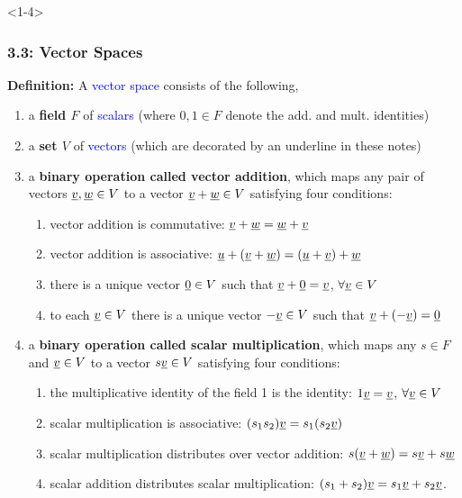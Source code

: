 \documentclass[10pt,english,aspectratio=169]{beamer}
\begin{document}
\begin{frame}<1-4> \frametitle{3.3: Vector Spaces}

\textbf{Definition:} A \textcolor{blue}{vector space} consists of the following,
\begin{enumerate}
\item<1-> a {\bf \boldmath field $F$} of \textcolor{blue}{scalars} (where $0,1 \in F$ denote the add. and mult. identities)
\item<2-> a {\bf \boldmath set $V$} of \textcolor{blue}{vectors} (which are decorated by an underline in these notes)
\item<3-> a \textbf{binary operation called vector addition}, which maps any pair of vectors $\underline{v}, \underline{w} \in V$ to a vector $\underline{v} + \underline{w} \in V$ satisfying four conditions:
\begin{enumerate}
\item vector addition is commutative: $\underline{v} + \underline{w} = \underline{w} + \underline{v}$
\item vector addition is associative: $\underline{u} + (\underline{v} + \underline{w}) = (\underline{u} + \underline{v}) + \underline{w}$
\item there is a unique vector $\underline{0} \in V$ such that $\underline{v} + \underline{0} = \underline{v}$, $\forall \underline{v} \in V$
\item to each $\underline{v} \in V$ there is a unique vector $- \underline{v} \in V$ such that $\underline{v} + (- \underline{v}) = \underline{0}$
\end{enumerate}
\item<4-> a \textbf{binary operation called scalar multiplication}, which maps any $s \in F$ and $\underline{v} \in V$ to a vector $s \underline{v} \in V$ satisfying four conditions:
\begin{enumerate}
\item the multiplicative identity of the field 1 is the identity: $1 \underline{v} = \underline{v}$, $\forall \underline{v} \in V$
\item scalar multiplication is associative: $(s_1 s_2) \underline{v} = s_1 ( s_2 \underline{v} )$
\item scalar multiplication distributes over vector addition: $s ( \underline{v} + \underline{w} ) = s \underline{v} + s \underline{w}$
\item scalar addition distributes scalar multiplication: $(s_1 + s_2) \underline{v} = s_1 \underline{v} + s_2 \underline{v}$.
\end{enumerate}
\end{enumerate}


\end{frame}
\end{document}
